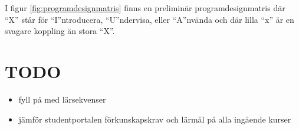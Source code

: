 \documentclass[twocolumn]{article}
\begin{document}
I figur \ref{fig:programdesignmatris} finns en preliminär
programdesignmatris där ``X'' står för ``I''ntroducera, ``U''ndervisa, eller ``A''nvända och
där lilla ``x'' är en svagare koppling än stora ``X''.

\appendix

% 
\section{TODO}
\begin{itemize}
\item fyll på med lärsekvenser
\item jämför studentportalen förkunskapskrav och lärmål på alla ingående kurser
\end{itemize}

\end{document}
